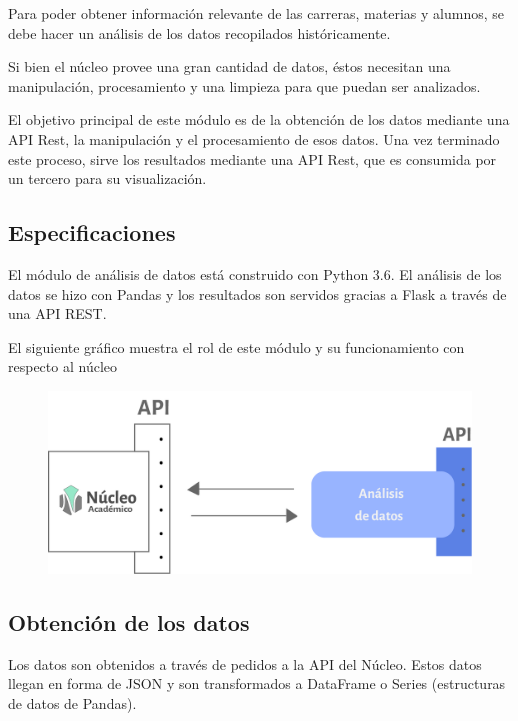 Para poder obtener información relevante de las carreras, materias y alumnos, se debe hacer un análisis de los datos recopilados históricamente.

Si bien el núcleo provee una gran cantidad de datos, éstos necesitan una manipulación, procesamiento y una limpieza para que puedan ser analizados.

El objetivo principal de este módulo es de la obtención de los datos mediante una API Rest, la manipulación y el procesamiento de esos datos. Una vez terminado este proceso, sirve los resultados mediante una API Rest, que es consumida por un tercero para su visualización.

\subsection{Especificaciones}

El módulo de análisis de datos está construido con Python 3.6. El análisis de los datos se hizo con Pandas y los resultados son servidos gracias a Flask a través de una API REST.


El siguiente gráfico muestra el rol de este módulo y su funcionamiento con respecto al núcleo

\begin{figure}[h!]
  \centering
    \includegraphics[scale=0.8]{images/analisis-datos/analisis-datos.png}
  \label{fig:django}
\end{figure}

\subsection{Obtención de los datos}

Los datos son obtenidos a través de pedidos a la API del Núcleo. Estos datos llegan en forma de JSON y son transformados a DataFrame o Series (estructuras de datos de Pandas). 

